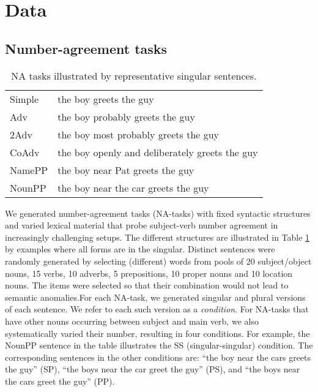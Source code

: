 \section{Data}
\subsection{Number-agreement tasks}

\begin{table}[tb]
  \centering
  \begin{footnotesize}
  \begin{tabular}{l@{\hskip1pt}l}
    \B Simple & the boy greets the guy\\
    \B Adv & the boy probably greets the guy\\
    \B 2Adv & the boy most probably greets the guy\\
    \B CoAdv &  the boy openly and deliberately greets the guy\\
    \B NamePP & the boy near Pat greets the guy\\
    \B NounPP & the boy near the car greets the guy\\
  \end{tabular}
  \end{footnotesize}
  \caption{NA tasks illustrated by representative
    singular sentences.}
  \label{tab:data-sets}
\end{table}

We generated number-agreement tasks (NA-tasks) with fixed syntactic
structures and varied lexical material that probe subject-verb number
agreement in increasingly challenging setups. The different structures
are illustrated in Table \ref{tab:data-sets} by examples where all
forms are in the singular. Distinct sentences were randomly generated
by selecting (different) words from pools of 20 subject/object nouns,
15 verbs, 10 adverbs, 5 prepositions, 10 proper nouns and 10 location
nouns. The items were selected so that their combination would not
lead to semantic anomalies.For each NA-task, we generated singular and
plural versions of each sentence. We refer to each such version as a
\textit{condition}. For NA-tasks that have other nouns occurring between
subject and main verb, we also systematically varied their number,
resulting in four conditions. For example, the NounPP sentence in the
table illustrates the SS (singular-singular) condition. The
corresponding sentences in the other conditions are: ``the boy near
the cars greets the guy'' (SP), ``the boys near the car greet the
guy'' (PS), and ``the boys near the cars greet the guy'' (PP).

